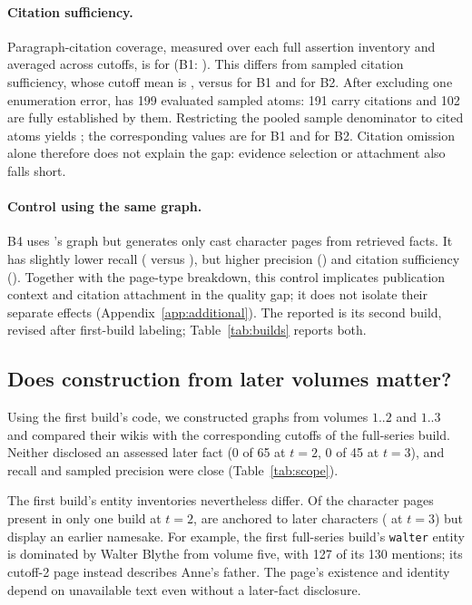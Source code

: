 \paragraph{Citation sufficiency.}
Paragraph-citation coverage, measured over each full assertion inventory and averaged
across cutoffs, is  for \sys (B1: ). This differs from
sampled citation sufficiency, whose cutoff mean is , versus
 for B1 and  for B2.
After excluding one enumeration error, \sys has 199 evaluated sampled atoms: 191 carry
citations and 102 are fully established
by them. Restricting the pooled sample denominator to cited atoms yields
; the corresponding values are  for B1 and
 for B2. Citation omission alone therefore does not explain the gap:
evidence selection or attachment also falls short.

\paragraph{Control using the same graph.}
B4 uses \sys's graph but generates only cast character pages from retrieved facts.
It has slightly lower recall ( versus ),
but higher precision () and citation sufficiency
(). Together with the page-type breakdown, this control implicates
publication context and citation attachment in the quality gap; it does not isolate
their separate effects (Appendix~\ref{app:additional}). The reported \sys is its second
build, revised after first-build labeling; Table~\ref{tab:builds} reports both.

\subsection{Does construction from later volumes matter?}
\label{sec:results-scope}
Using the first build's code, we constructed graphs from volumes $1..2$ and $1..3$
and compared their wikis with the corresponding cutoffs of the full-series build.
Neither disclosed an assessed later fact (0 of 65 at $t=2$, 0 of 45 at $t=3$), and
recall and sampled precision were close (Table~\ref{tab:scope}).

The first build's entity inventories nevertheless differ. Of the  character pages
present in only one build at $t=2$,  are anchored to later characters
( at $t=3$) but display an earlier namesake. For example, the
first full-series build's \texttt{walter} entity is dominated by Walter Blythe from volume five,
with 127 of its 130 mentions; its cutoff-2 page instead describes Anne's father.
The page's existence and identity depend on unavailable text even without a later-fact
disclosure.

